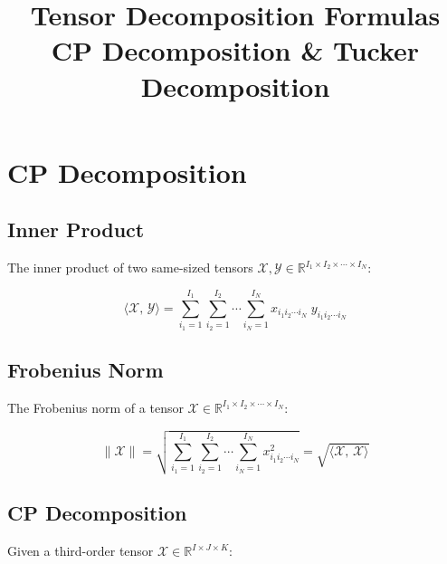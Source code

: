 \documentclass[12pt]{article}
\title{\textbf{Tensor Decomposition Formulas}\\[0.5em]
       \large CP Decomposition \quad \& \quad Tucker Decomposition}
\date{}
\newcommand{\T}[1]{\mathcal{#1}}   %
\begin{document}
\maketitle
\tableofcontents
\newpage

\section{CP Decomposition}

\subsection{Inner Product}

The inner product of two same-sized tensors
$\T{X}, \T{Y} \in \mathbb{R}^{I_1 \times I_2 \times \cdots \times I_N}$:

\begin{equation}
\langle \T{X},\, \T{Y} \rangle
= \sum_{i_1=1}^{I_1} \sum_{i_2=1}^{I_2} \cdots \sum_{i_N=1}^{I_N}
  x_{i_1 i_2 \cdots i_N}\; y_{i_1 i_2 \cdots i_N}
\end{equation}

\subsection{Frobenius Norm}

The Frobenius norm of a tensor
$\T{X} \in \mathbb{R}^{I_1 \times I_2 \times \cdots \times I_N}$:

\begin{equation}
\|\T{X}\|
= \sqrt{\sum_{i_1=1}^{I_1} \sum_{i_2=1}^{I_2} \cdots \sum_{i_N=1}^{I_N}
  x_{i_1 i_2 \cdots i_N}^{2}}
= \sqrt{\langle \T{X},\, \T{X} \rangle}
\end{equation}

\subsection{CP Decomposition}

Given a third-order tensor $\T{X} \in \mathbb{R}^{I \times J \times K}$:
\end{document}
